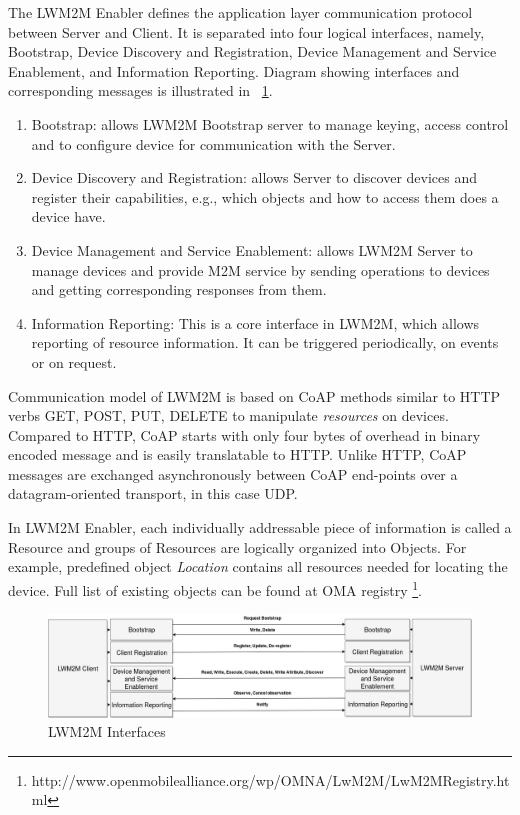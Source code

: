 The LWM2M Enabler defines the application layer communication protocol between Server and Client. It is separated into four logical interfaces, namely, Bootstrap, Device Discovery and Registration, Device Management and Service Enablement, and Information Reporting. Diagram showing interfaces and corresponding messages is illustrated in ~\ref{fig:LWM2MInterfaces}.

\begin{enumerate}
	\setlength{\itemsep}{1pt}
	\item Bootstrap: allows LWM2M Bootstrap server to manage keying, access control and to configure device for communication with the Server.
	\item Device Discovery and Registration: allows Server to discover devices and register their capabilities, e.g., which objects and how to access them does a device have.
	\item Device Management and Service Enablement: allows LWM2M Server to manage devices and provide M2M service by sending operations to devices and getting corresponding responses from them.
	\item Information Reporting: This is a core interface in LWM2M, which allows reporting of resource information. It can be triggered periodically, on events or on request.
\end{enumerate}

Communication model of LWM2M is based on CoAP methods similar to HTTP verbs GET, POST, PUT, DELETE to manipulate \emph{resources} on devices. Compared to HTTP, CoAP starts with only four bytes of overhead in binary encoded message and is easily translatable to HTTP. Unlike HTTP, CoAP messages are exchanged asynchronously between CoAP end-points over a datagram-oriented transport, in this case UDP.

In LWM2M Enabler, each individually addressable piece of information is called a Resource and groups of Resources are logically organized into Objects. For example, predefined object \emph{Location} contains all resources needed for locating the device. Full list of existing objects can be found at OMA registry \footnote{http://www.openmobilealliance.org/wp/OMNA/LwM2M/LwM2MRegistry.html}.

\begin{figure}[ht]
	\begin{center}
		\includegraphics[width=\textwidth]{images/LWM2M-Interfaces}
		\caption{LWM2M Interfaces}
		\label{fig:LWM2MInterfaces}
	\end{center}
\end{figure}

